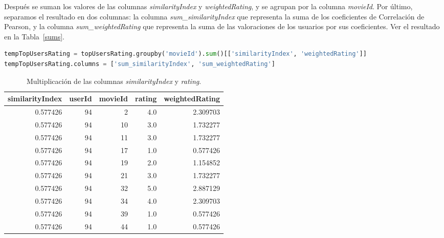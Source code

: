 \documentclass{uimppracticas}
\begin{document}
Después se suman los valores de las columnas \textit{similarityIndex} y \textit{weightedRating}, y se agrupan por la columna \textit{movieId}. Por último, separamos el resultado en dos columnas: la columna \textit{sum\_similarityIndex} que representa la suma de los coeficientes de Correlación de Pearson, y la columna \textit{sum\_weightedRating} que representa la suma de las valoraciones de los usuarios por sus coeficientes. Ver el resultado en la Tabla~\ref{sums}.

\begin{lstlisting}[language=python, basicstyle=\small]
tempTopUsersRating = topUsersRating.groupby('movieId').sum()[['similarityIndex', 'weightedRating']]
tempTopUsersRating.columns = ['sum_similarityIndex', 'sum_weightedRating']
\end{lstlisting} 

\begin{table}[H]
	\centering
	\begin{tabular}{rrrrr}
		\toprule
		similarityIndex &  userId &  movieId &  rating &  weightedRating \\
		\midrule
		0.577426 &      94 &        2 &     4.0 &        2.309703 \\
		0.577426 &      94 &       10 &     3.0 &        1.732277 \\
		0.577426 &      94 &       11 &     3.0 &        1.732277 \\
		0.577426 &      94 &       17 &     1.0 &        0.577426 \\
		0.577426 &      94 &       19 &     2.0 &        1.154852 \\
		0.577426 &      94 &       21 &     3.0 &        1.732277 \\
		0.577426 &      94 &       32 &     5.0 &        2.887129 \\
		0.577426 &      94 &       34 &     4.0 &        2.309703 \\
		0.577426 &      94 &       39 &     1.0 &        0.577426 \\
		0.577426 &      94 &       44 &     1.0 &        0.577426 \\
		\bottomrule
	\end{tabular}
	\caption{Multiplicación de las columnas \textit{similarityIndex} y \textit{rating}.}
	\label{weightedRating}
\end{table}
\end{document}
